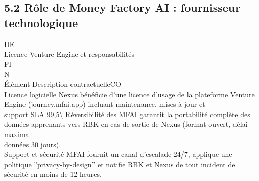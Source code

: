 \documentclass[12pt,landscape,a4paper]{article}
\begin{document}
\subsection{5.2 Rôle de Money Factory AI : fournisseur technologique}
\vspace{0.5em}
\vspace{0.5em}
\vspace{0.5em}
\vspace{0.5em}
DE\\
Licence Venture Engine et responsabilités\\
\vspace{0.5em}
\vspace{0.5em}
\vspace{0.5em}
\vspace{0.5em}
FI\\
N\\
Élément                      Description contractuelleCO\\
Licence logicielle           Nexus bénéficie d’une licence d’usage de la plateforme Venture Engine (journey.mfai.app) incluant maintenance, mises à jour et\\
support SLA 99,5\textbackslash{}%
Réversibilité des            MFAI garantit la portabilité complète des données apprenants vers RBK en cas de sortie de Nexus (format ouvert, délai maximal\\
données                      30 jours).\\
Support et sécurité          MFAI fournit un canal d’escalade 24/7, applique une politique ”privacy-by-design” et notifie RBK et Nexus de tout incident de\\
sécurité en moins de 12 heures.\\
\vspace{0.5em}
\vspace{0.5em}
\vspace{0.5em}
\vspace{0.5em}
\end{document}
